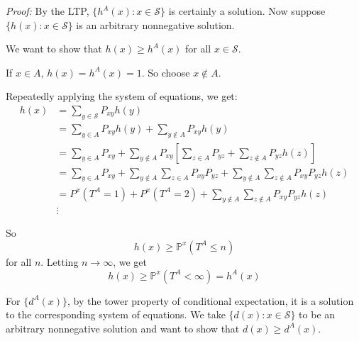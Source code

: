 \documentclass[12pt]{report}
\renewcommand{\P}{\mathbb{P}}
\renewcommand{\S}{\mathcal{S}}
\newenvironment*{tbox}[2][gray]{
    \begin{tcolorbox}[
        parbox=false,
        colback=#1!5!white,
        colframe=#1!75!black,
        breakable,
        title={#2}
    ]}
    {\end{tcolorbox}}
\begin{document}
    \begin{tbox}{\textbf{Theorem:} The vector $\{h^A(x): x \in \S\}$ is the minimal nonnegative solution of 
        \[h(x) = \begin{cases}
            \sum_{y \in \S} P_{xy}h(y) & x \notin A\\ 
            1 & x \in A
        \end{cases}\]
        Similarly, $\{d^A(x): x \in \S\}$ is the minimal nonnegative solution of
        \[d(x) = \begin{cases}
            1 + \sum_{y \in \S} P_{xy} h(y) & x \notin A\\
            0 & x \in A
        \end{cases}\]}

        \emph{Proof:} By the LTP, $\{h^A(x): x \in \S\}$ is certainly a solution. Now suppose $\{h(x): x \in \S\}$ is an arbitrary nonnegative solution. 

        We want to show that $h(x) \geq h^A(x)$ for all $x \in \S$. 

        If $x \in A$, $h(x) = h^A(x) = 1$. So choose $x \notin A$. 

        Repeatedly applying the system of equations, we get:
        \begin{align*}
            h(x) &= \sum_{y \in \S} P_{xy} h(y)\\ 
                &= \sum_{y \in A} P_{xy} h(y) + \sum_{y \notin A} P_{xy} h(y)\\ 
                &= \sum_{y \in A} P_{xy} + \sum_{y \notin A} P_{xy} \left[\sum_{z \in A} P_{yz} + \sum_{z \notin A} P_{yz} h(z)\right]\\
                &= \sum_{y \in A} P_{xy} + \sum_{y \notin A} \sum_{z \in A} P_{xy} P_{yz} + \sum_{y \notin A} \sum_{z \notin A} P_{xy} P_{yz} h(z)\\
                &= P^x(T^A = 1) + P^x(T^A = 2) + \sum_{y \notin A} \sum_{z \notin A} P_{xy} P_{yz} h(z)\\ 
                &\vdots
        \end{align*}

        So 
        \[h(x) \geq \P^x(T^A \leq n)\]
        for all $n$. Letting $n \to \infty$, we get 
        \[h(x) \geq \P^x(T^A < \infty) = h^A(x)\]

        For $\{d^A(x)\}$, by the tower property of conditional expectation, it is a solution to the corresponding system of equations. We take $\{d(x): x \in \S\}$ to be an arbitrary nonnegative solution and want to show that $d(x) \geq d^A(x)$. 


\end{tbox}
\end{document}
